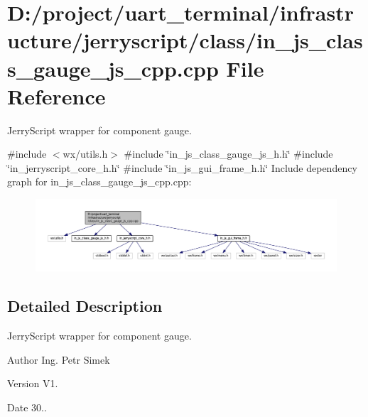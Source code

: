 \section{D\+:/project/uart\+\_\+terminal/infrastructure/jerryscript/class/in\+\_\+js\+\_\+class\+\_\+gauge\+\_\+js\+\_\+cpp.cpp File Reference}
\label{in__js__class__gauge__js__cpp_8cpp}


Jerry\+Script wrapper for component gauge.  


{\ttfamily \#include $<$wx/utils.\+h$>$}\newline
{\ttfamily \#include \char`\"{}in\+\_\+js\+\_\+class\+\_\+gauge\+\_\+js\+\_\+h.\+h\char`\"{}}\newline
{\ttfamily \#include \char`\"{}in\+\_\+jerryscript\+\_\+core\+\_\+h.\+h\char`\"{}}\newline
{\ttfamily \#include \char`\"{}in\+\_\+js\+\_\+gui\+\_\+frame\+\_\+h.\+h\char`\"{}}\newline
Include dependency graph for in\+\_\+js\+\_\+class\+\_\+gauge\+\_\+js\+\_\+cpp.\+cpp\+:
\nopagebreak
\begin{figure}[H]
\begin{center}
\leavevmode
\includegraphics[width=350pt]{in__js__class__gauge__js__cpp_8cpp__incl}
\end{center}
\end{figure}


\subsection{Detailed Description}
Jerry\+Script wrapper for component gauge. 

\begin{DoxyAuthor}{Author}
Ing. Petr Simek 
\end{DoxyAuthor}
\begin{DoxyVersion}{Version}
V1. 
\end{DoxyVersion}
\begin{DoxyDate}{Date}
30.. 
\end{DoxyDate}
